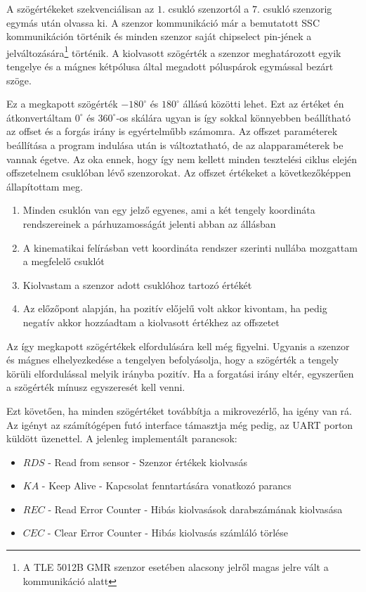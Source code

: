 A szögértékeket szekvenciálisan az $1.$ csukló szenzortól a $7.$ csukló szenzorig egymás után olvassa ki. A szenzor kommunikáció már a bemutatott SSC kommunikáción történik és minden szenzor saját chipselect pin-jének a jelváltozására\footnote{A TLE 5012B GMR szenzor esetében alacsony jelről magas jelre vált a kommunikáció alatt} történik. A kiolvasott szögérték a szenzor meghatározott egyik tengelye és a mágnes kétpólusa által megadott póluspárok egymással bezárt szöge.


Ez a megkapott szögérték $-180^\circ$ és $180^\circ$ állású közötti lehet. Ezt az értéket én átkonvertáltam $0^\circ$ és $360^\circ$-os skálára ugyan is így sokkal könnyebben beállítható az offset és a forgás irány is egyértelműbb számomra. Az offszet paraméterek beállítása a program indulása után is változtatható, de az alapparaméterek be vannak égetve. Az oka ennek, hogy így nem kellett minden tesztelési ciklus elején offszetelnem csuklóban lévő szenzorokat. Az offszet értékeket a következőképpen állapítottam meg.

\begin{enumerate}
  \item Minden csuklón van egy jelző egyenes, ami a két tengely koordináta rendszereinek a párhuzamosságát jelenti abban az állásban
  \item A kinematikai felírásban vett koordináta rendszer szerinti nullába mozgattam a megfelelő csuklót
  \item Kiolvastam a szenzor adott csuklóhoz tartozó értékét
  \item Az előzőpont alapján, ha pozitív előjelű volt akkor kivontam, ha pedig negatív akkor hozzáadtam a kiolvasott értékhez az offszetet
\end{enumerate}

Az így megkapott szögértékek elfordulására kell még figyelni. Ugyanis a szenzor és mágnes elhelyezkedése a tengelyen befolyásolja, hogy a szögérték a tengely körüli elfordulással melyik irányba pozitív. Ha a forgatási irány eltér, egyszerűen a szögérték mínusz egyszeresét kell venni. 

Ezt követően, ha minden szögértéket továbbítja a mikrovezérlő, ha igény van rá. Az igényt az számítógépen futó interface támasztja még pedig, az UART porton küldött üzenettel. A jelenleg implementált parancsok:

\begin{itemize}
\item $RDS$ - Read from sensor - Szenzor értékek kiolvasás 
\item $KA$ - Keep Alive - Kapcsolat fenntartására vonatkozó parancs
\item $REC$ - Read Error Counter - Hibás kiolvasások darabszámának kiolvasása
\item $CEC$ - Clear Error Counter - Hibás kiolvasás számláló törlése
\end{itemize}

